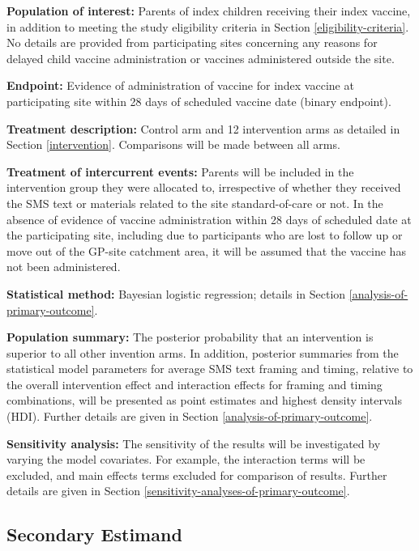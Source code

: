 \documentclass[
  bibliography=totoc]{scrreprt}
\begin{document}
\textbf{Population of interest:} Parents of index children receiving their index vaccine, in addition to meeting the study eligibility criteria in Section \ref{eligibility-criteria}.
No details are provided from participating sites concerning any reasons for delayed child vaccine administration or vaccines administered outside the site.

\textbf{Endpoint:} Evidence of administration of vaccine for index vaccine at participating site within 28 days of scheduled vaccine date (binary endpoint).

\textbf{Treatment description:} Control arm and 12 intervention arms as detailed in Section \ref{intervention}.
Comparisons will be made between all arms.

\textbf{Treatment of intercurrent events:} Parents will be included in the intervention group they were allocated to, irrespective of whether they received the SMS text or materials related to the site standard-of-care or not.
In the absence of evidence of vaccine administration within 28 days of scheduled date at the participating site, including due to participants who are lost to follow up or move out of the GP-site catchment area, it will be assumed that the vaccine has not been administered.

\textbf{Statistical method:} Bayesian logistic regression; details in Section \ref{analysis-of-primary-outcome}.

\textbf{Population summary:} The posterior probability that an intervention is superior to all other invention arms.
In addition, posterior summaries from the statistical model parameters for average SMS text framing and timing, relative to the overall intervention effect and interaction effects for framing and timing combinations, will be presented as point estimates and highest density intervals (HDI).
Further details are given in Section \ref{analysis-of-primary-outcome}.

\textbf{Sensitivity analysis:} The sensitivity of the results will be investigated by varying the model covariates.
For example, the interaction terms will be excluded, and main effects terms excluded for comparison of results.
Further details are given in Section \ref{sensitivity-analyses-of-primary-outcome}.

\hypertarget{secondary-estimand}{%
\subsection{Secondary Estimand}\label{secondary-estimand}}
\end{document}
